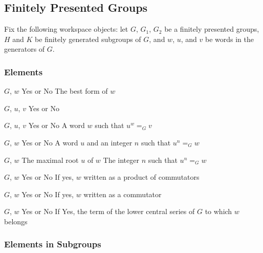 

\subsection{Finitely Presented Groups}

Fix the following workspace objects: let $G$, $G_1$, $G_2$ be a
finitely presented groups, $H$ and $K$ be finitely generated subgroups
of $G$, and $w$, $u$, and $v$ be words in the generators of $G$.


\subsubsection{Elements}

\begin{enumerate}

{$G$, $w$}
{Yes or No}
{The best form of $w$}

{$G$, $u$, $v$}
{Yes or No}

{$G$, $u$, $v$}
{Yes or No}
{A word $w$ such that $u^w=_G v$}

{$G$, $w$}
{Yes or No}
{A word $u$ and an integer $n$ such that $u^n =_G w$}

{$G$, $w$}
{The maximal root $u$ of $w$}
{The integer $n$ such that $u^n =_G w$}

{$G$, $w$}
{Yes or No}
{If yes, $w$ written as a product of commutators}

{$G$, $w$}
{Yes or No}
{If yes, $w$ written as a commutator}

{$G$, $w$}
{Yes or No}
{If Yes, the term of the lower central series of $G$ to which $w$ belongs}

\end{enumerate}


\subsubsection{Elements in Subgroups}

